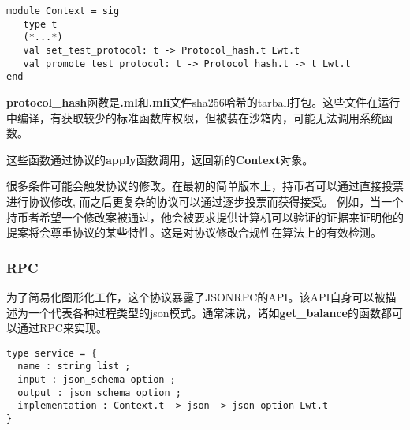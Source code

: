\documentclass[letterpaper]{article}
\begin{document}
\begin{lstlisting}
module Context = sig
   type t
   (*...*)
   val set_test_protocol: t -> Protocol_hash.t Lwt.t
   val promote_test_protocol: t -> Protocol_hash.t -> t Lwt.t
end
\end{lstlisting}

\textbf{protocol\_hash}函数是\textbf{.ml}和\textbf{.mli}文件sha256哈希的tarball打包。这些文件在运行中编译，有获取较少的标准函数库权限，但被装在沙箱内，可能无法调用系统函数。

这些函数通过协议的\textbf{apply}函数调用，返回新的\textbf{Context}对象。

很多条件可能会触发协议的修改。在最初的简单版本上，持币者可以通过直接投票进行协议修改, 而之后更复杂的协议可以通过逐步投票而获得接受。
例如，当一个持币者希望一个修改案被通过，他会被要求提供计算机可以验证的证据来证明他的提案将会尊重协议的某些特性。这是对协议修改合规性在算法上的有效检测。

\subsubsection{RPC}
为了简易化图形化工作，这个协议暴露了JSONRPC的API。该API自身可以被描述为一个代表各种过程类型的json模式。通常涞说，诸如\textbf{get\_balance}的函数都可以通过RPC来实现。

\begin{lstlisting}
type service = {
  name : string list ;
  input : json_schema option ;
  output : json_schema option ;
  implementation : Context.t -> json -> json option Lwt.t
}
\end{lstlisting}
\end{document}
